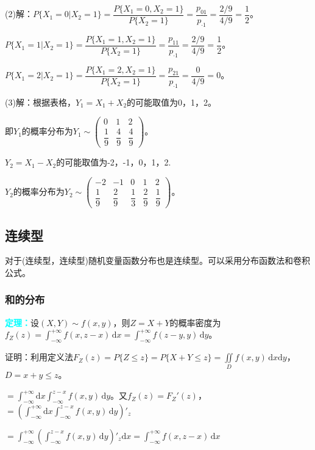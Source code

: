 \documentclass[UTF8, 12pt]{ctexart}
\begin{document}
(2)解：$P\{X_1=0|X_2=1\}=\dfrac{P\{X_1=0,X_2=1\}}{P\{X_2=1\}}=\dfrac{p_{01}}{p_{\cdot1}}=\dfrac{2/9}{4/9}=\dfrac{1}{2}$。

$P\{X_1=1|X_2=1\}=\dfrac{P\{X_1=1,X_2=1\}}{P\{X_2=1\}}=\dfrac{p_{11}}{p_{\cdot1}}=\dfrac{2/9}{4/9}=\dfrac{1}{2}$。

$P\{X_1=2|X_2=1\}=\dfrac{P\{X_1=2,X_2=1\}}{P\{X_2=1\}}=\dfrac{p_{21}}{p_{\cdot1}}=\dfrac{0}{4/9}=0$。

(3)解：根据表格，$Y_1=X_1+X_2$的可能取值为0，1，2。

即$Y_1$的概率分布为$Y_1\sim\left(\begin{array}{ccc}
    0 & 1 & 2 \\
    \dfrac{1}{9} & \dfrac{4}{9} & \dfrac{4}{9}
\end{array}\right)$。

$Y_2=X_1-X_2$的可能取值为-2，-1，0，1，2.

$Y_2$的概率分布为$Y_2\sim\left(\begin{array}{ccccc}
    -2 & -1 & 0 & 1 & 2 \\
    \dfrac{1}{9} & \dfrac{2}{9} & \dfrac{1}{3} & \dfrac{2}{9} & \dfrac{1}{9}
\end{array}\right)$。

\subsection{连续型}

对于(连续型，连续型)随机变量函数分布也是连续型。可以采用分布函数法和卷积公式。

\subsubsection{和的分布}

\textcolor{aqua}{\textbf{定理：}}设$(X,Y)\sim f(x,y)$，则$Z=X+Y$的概率密度为$f_Z(z)=\int_{-\infty}^{+\infty}f(x,z-x)\,\textrm{d}x=\int_{-\infty}^{+\infty}f(z-y,y)\,\textrm{d}y$。

证明：利用定义法$F_Z(z)=P\{Z\leqslant z\}=P\{X+Y\leqslant z\}=\iint\limits_Df(x,y)\,\textrm{d}x\textrm{d}y$，$D=x+y\leqslant z$。

$=\int_{-\infty}^{+\infty}\textrm{d}x\int_{-\infty}^{z-x}f(x,y)\,\textrm{d}y$。又$f_Z(z)=F_Z'(z)$，$=(\int_{-\infty}^{+\infty}\textrm{d}x\int_{-\infty}^{z-x}f(x,y)\,\textrm{d}y)'_z$

$=\int_{-\infty}^{+\infty}(\int_{-\infty}^{z-x}f(x,y)\,\textrm{d}y)'_z\textrm{d}x=\int_{-\infty}^{+\infty}f(x,z-x)\,\textrm{d}x$
\end{document}
